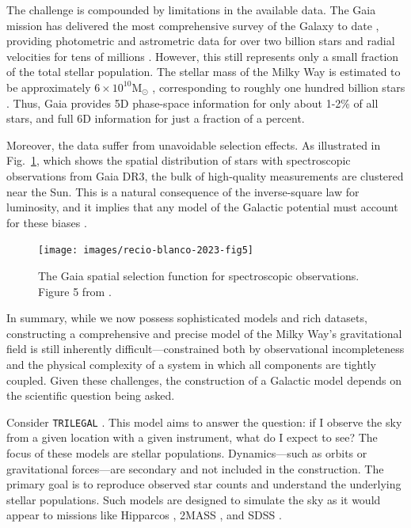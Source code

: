         The challenge is compounded by limitations in the available data. The Gaia mission has delivered the most comprehensive survey of the Galaxy to date \citep{2023A&A...674A...1G}, providing photometric and astrometric data for over two billion stars and radial velocities for tens of millions \citep{2018A&A...616A..11G}. However, this still represents only a small fraction of the total stellar population. The stellar mass of the Milky Way is estimated to be approximately $6\times10^{10} \mathrm{M}_\odot$ \citep{2015ApJ...806...96L}, corresponding to roughly one hundred billion stars \citep[see also][]{2017MNRAS.465...76M}. Thus, Gaia provides 5D phase-space information for only about 1-2\% of all stars, and full 6D information for just a fraction of a percent.

        Moreover, the data suffer from unavoidable selection effects. As illustrated in Fig.~\ref{fig:gaia_selection_function}, which shows the spatial distribution of stars with spectroscopic observations from Gaia DR3, the bulk of high-quality measurements are clustered near the Sun. This is a natural consequence of the inverse-square law for luminosity, and it implies that any model of the Galactic potential must account for these biases \citep{2025A&A...695A.220K}.
        \begin{figure}
            \texttt{[image: images/recio-blanco-2023-fig5]}
            \caption{The Gaia spatial selection function for spectroscopic observations. Figure 5 from \citet{2023A&A...674A..38G}.}
            \label{fig:gaia_selection_function}
        \end{figure}
        In summary, while we now possess sophisticated models and rich datasets, constructing a comprehensive and precise model of the Milky Way's gravitational field is still inherently difficult—constrained both by observational incompleteness and the physical complexity of a system in which all components are tightly coupled. Given these challenges, the construction of a Galactic model depends on the scientific question being asked.

        Consider \texttt{TRILEGAL} \citep{2005A&A...436..895G}. This model aims to answer the question: if I observe the sky from a given location with a given instrument, what do I expect to see? The focus of these models are stellar populations. Dynamics—such as orbits or gravitational forces—are secondary and not included in the construction. The primary goal is to reproduce observed star counts and understand the underlying stellar populations. Such models are designed to simulate the sky as it would appear to missions like Hipparcos \citep{1997A&A...323L..49P}, 2MASS \citep{2006AJ....131.1163S}, and SDSS \citep{2000AJ....120.1579Y}.

